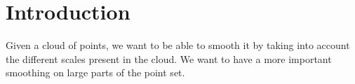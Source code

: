 \chapter{Introduction}

Given a cloud of points, we want to be able to smooth it by taking into account
the different scales present in the cloud. We want to have a more important
smoothing on large parts of the point set.

